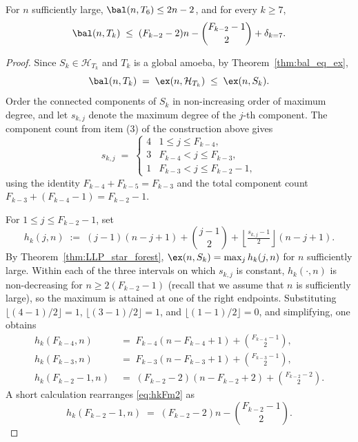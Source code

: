 \begin{proposition}\label{prop:bal_Tk_upper}
    For $n$ sufficiently large, $\bal(n,T_6)\leq 2n-2$, and for every $k\geq 7$,
    $$
        \bal(n,T_k)\;\leq\;(F_{k-2}-2)n-\binom{F_{k-2}-1}{2}+\delta_{k=7}.
    $$
\end{proposition}

\begin{proof}
    Since $S_k\in\mathcal H_{T_k}$ and $T_k$ is a global amoeba, by Theorem~\ref{thm:bal_eq_ex},
    $$
        \bal(n,T_k)\;=\;\ex(n,\mathcal H_{T_k})\;\leq\;\ex(n,S_k).
    $$
    Order the connected components of $S_k$ in non-increasing order of maximum degree, and let $s_{k,j}$ denote the maximum degree of the $j$-th component.
    The component count from item (3) of the construction above gives
    $$
        s_{k,j}\;=\;\begin{cases}
            4 & 1\leq j\leq F_{k-4},\\
            3 & F_{k-4}<j\leq F_{k-3},\\
            1 & F_{k-3}<j\leq F_{k-2}-1,
        \end{cases}
    $$
    using the identity $F_{k-4}+F_{k-5}=F_{k-3}$ and the total component count $F_{k-3}+(F_{k-4}-1)=F_{k-2}-1$.

    For $1\leq j\leq F_{k-2}-1$, set
    $$
        h_k(j,n) \;:=\; (j-1)(n-j+1)+\binom{j-1}{2}+\left\lfloor\tfrac{s_{k,j}-1}{2}\right\rfloor(n-j+1).
    $$
    By Theorem~\ref{thm:LLP_star_forest}, $\ex(n,S_k)=\max_{j} h_k(j,n)$ for $n$ sufficiently large.
    Within each of the three intervals on which $s_{k,j}$ is constant, $h_k(\cdot,n)$ is non-decreasing for $n\geq 2(F_{k-2}-1)$ (recall that we assume that $n$ is sufficiently large), so the maximum is attained at one of the right endpoints.
    Substituting $\lfloor(4-1)/2\rfloor=1$, $\lfloor(3-1)/2\rfloor=1$, and $\lfloor(1-1)/2\rfloor=0$, and simplifying, one obtains
    \begin{align}
        h_k(F_{k-4},n) &\;=\; F_{k-4}(n-F_{k-4}+1)+\binom{F_{k-4}-1}{2}, \label{eq:hkFm4}\\
        h_k(F_{k-3},n) &\;=\; F_{k-3}(n-F_{k-3}+1)+\binom{F_{k-3}-1}{2}, \label{eq:hkFm3}\\
        h_k(F_{k-2}-1,n) &\;=\; (F_{k-2}-2)(n-F_{k-2}+2)+\binom{F_{k-2}-2}{2}. \label{eq:hkFm2}
    \end{align}
    A short calculation rearranges \eqref{eq:hkFm2} as
    \begin{equation}\label{eq:hkFm2_rearranged}
        h_k(F_{k-2}-1,n)\;=\;(F_{k-2}-2)n-\binom{F_{k-2}-1}{2}.
    \end{equation}


\end{proof}
